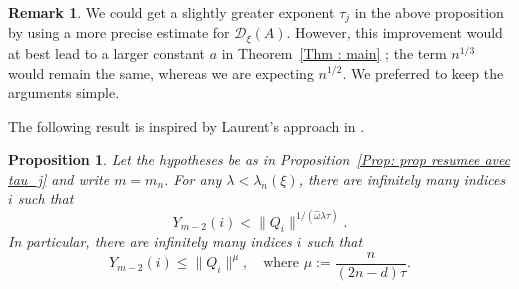 \documentclass[JEP,XML,SOM,Unicode,NoFloatCountersInSection,published]{cedram}
\newcommand\homega{\widehat{\omega}}\newcommand\HH{\mathcal{H}}
\newcommand\HHstar{\mathcal{D}_{\xi}}
\newcommand{\normH}[1]{\|#1\|}
\theoremstyle{definition}
\newtheorem{Rem}[Def]{Remark}
\theoremstyle{plain}
\newtheorem{Prop}[Def]{Proposition}
\begin{document}
\begin{Rem}
We could get a slightly greater exponent $\tau_j$ in the above proposition by using a more precise estimate for $\HHstar(A)$. However, this improvement would at best lead to a larger constant $a$ in Theorem~\ref{Thm : main} ; the term $n^{1/3}$ would remain the same, whereas we are expecting $n^{1/2}$. We preferred to keep the arguments simple.
\end{Rem}

The following result is inspired by Laurent's approach in \cite[Lem.\,5]{laurent2003simultaneous}.

\begin{Prop}
\label{Prop: majoration Y_m-2}
Let the hypotheses be as in Proposition~\ref{Prop: prop resumee avec tau_j} and write $m=m_n$. For any $\lambda < \lambda_n(\xi)$, there are infinitely many indices $i$ such that
\begin{equation*}
\label{eq: majoration theta_m-2 eq 0}
Y_{m-2}(i) < \normH{Q_i}^{1/(\homega\lambda\tau)}.
\end{equation*}
In particular, there are infinitely many indices $i$ such that
\begin{equation}
\label{eq: majoration theta_m-2}
Y_{m-2}(i) \leq \normH{Q_i}^\mu,\quad \textrm{where } \mu := \frac{n}{(2n-d)\tau}.
\end{equation}
\end{Prop}
\end{document}
